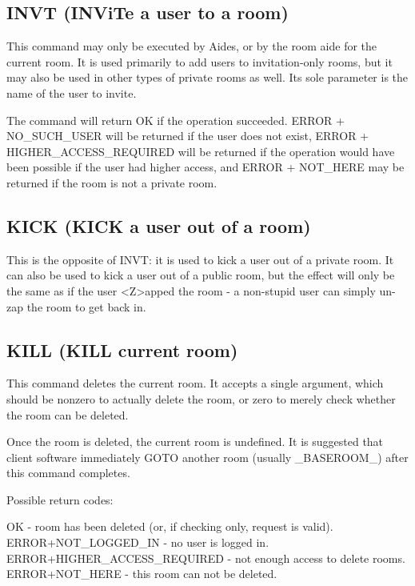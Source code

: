 \subsection{INVT (INViTe a user to a room)}

 This command may only be executed by Aides, or by the room aide for the
current room.  It is used primarily to add users to invitation-only rooms,
but it may also be used in other types of private rooms as well.  Its sole
parameter is the name of the user to invite.

 The command will return OK if the operation succeeded.  ERROR + NO_SUCH_USER
will be returned if the user does not exist, ERROR + HIGHER_ACCESS_REQUIRED
will be returned if the operation would have been possible if the user had
higher access, and ERROR + NOT_HERE may be returned if the room is not a
private room.



\subsection{KICK (KICK a user out of a room)}

 This is the opposite of INVT: it is used to kick a user out of a private
room.  It can also be used to kick a user out of a public room, but the
effect will only be the same as if the user <Z>apped the room - a non-stupid
user can simply un-zap the room to get back in.



\subsection{KILL (KILL current room)}

 This command deletes the current room.  It accepts a single argument, which
should be nonzero to actually delete the room, or zero to merely check
whether the room can be deleted.

 Once the room is deleted, the current room is undefined.  It is suggested
that client software immediately GOTO another room (usually _BASEROOM_)
after this command completes.

 Possible return codes:

 OK  -  room has been deleted (or, if checking only, request is valid).
 ERROR+NOT_LOGGED_IN  -  no user is logged in.
 ERROR+HIGHER_ACCESS_REQUIRED  -  not enough access to delete rooms.
 ERROR+NOT_HERE  -  this room can not be deleted.



